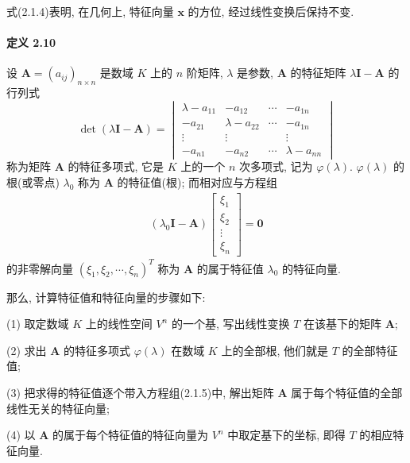 \par 式(2.1.4)表明, 在几何上, 特征向量 $\bm{x}$ 的方位, 经过线性变换后保持不变.

\paragraph*{定义 2.10} 设 $\bm{A} = (a_{ij})_{n\times n}$ 是数域 $K$ 上的 $n$ 阶矩阵, $\lambda$ 是参数, $\bm{A}$ 的特征矩阵 $\lambda\bm{I} - \bm{A}$ 的
行列式
$$
    \det (\lambda\bm{I} - \bm{A}) = \begin{vmatrix}
        \lambda - a_{11} & -a_{12}          & \cdots & -a_{1n}          \\
        -a_{21}          & \lambda - a_{22} & \cdots & -a_{1n}          \\
        \vdots           & \vdots           &        & \vdots           \\
        -a_{n1}          & -a_{n2}          & \cdots & \lambda - a_{nn}
    \end{vmatrix}
$$
称为矩阵 $\bm{A}$ 的特征多项式, 它是 $K$ 上的一个 $n$ 次多项式, 记为 $\varphi(\lambda)$. $\varphi(\lambda)$ 的根(或零点)
$\lambda_0$ 称为 $\bm{A}$ 的特征值(根); 而相对应与方程组
\begin{gather}
    (\lambda_0\bm{I} - \bm{A})\begin{bmatrix}
        \xi_1  \\
        \xi_2  \\
        \vdots \\
        \xi_n
    \end{bmatrix} = \bm{0}
    \tag{2.1.5}
\end{gather}
的非零解向量 $(\xi_1, \xi_2, \cdots, \xi_n)^T$ 称为 $\bm{A}$ 的属于特征值 $\lambda_0$ 的特征向量.

\par 那么, 计算特征值和特征向量的步骤如下:
\par (1) 取定数域 $K$ 上的线性空间 $V^n$ 的一个基, 写出线性变换 $T$ 在该基下的矩阵 $\bm{A}$;
\par (2) 求出 $\bm{A}$ 的特征多项式 $\varphi(\lambda)$ 在数域 $K$ 上的全部根, 他们就是 $T$ 的全部特征值;
\par (3) 把求得的特征值逐个带入方程组(2.1.5)中, 解出矩阵 $\bm{A}$ 属于每个特征值的全部线性无关的特征向量;
\par (4) 以 $\bm{A}$ 的属于每个特征值的特征向量为 $V^n$ 中取定基下的坐标, 即得 $T$ 的相应特征向量.


